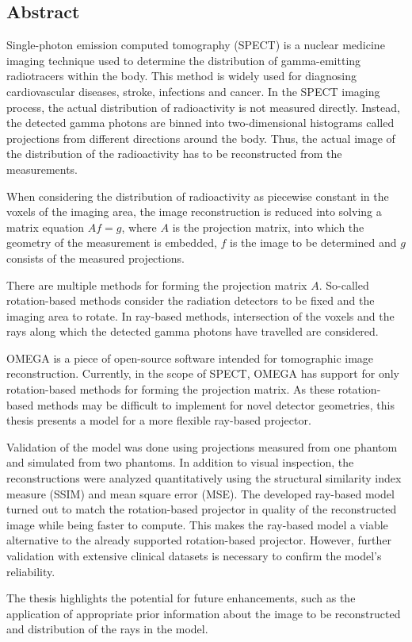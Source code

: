 \begin{titlepage}
    \section*{Abstract}
    Single-photon emission computed tomography (SPECT) is a nuclear medicine imaging technique used to determine the distribution of gamma-emitting radiotracers within the body. This method is widely used for diagnosing cardiovascular diseases, stroke, infections and cancer. In the SPECT imaging process, the actual distribution of radioactivity is not measured directly. Instead, the detected gamma photons are binned into two-dimensional histograms called projections from different directions around the body. Thus, the actual image of the distribution of the radioactivity has to be reconstructed from the measurements.
    
    When considering the distribution of radioactivity as piecewise constant in the voxels of the imaging area, the image reconstruction is reduced into solving a matrix equation $Af=g$, where $A$ is the projection matrix, into which the geometry of the measurement is embedded, $f$ is the image to be determined and $g$ consists of the measured projections.
    
    There are multiple methods for forming the projection matrix $A$. So-called rotation-based methods consider the radiation detectors to be fixed and the imaging area to rotate. In ray-based methods, intersection of the voxels and the rays along which the detected gamma photons have travelled are considered.
    
    OMEGA is a piece of open-source software intended for tomographic image reconstruction. Currently, in the scope of SPECT, OMEGA has support for only rotation-based methods for forming the projection matrix. As these rotation-based methods may be difficult to implement for novel detector geometries, this thesis presents a model for a more flexible ray-based projector.
    
    Validation of the model was done using projections measured from one phantom and simulated from two phantoms. In addition to visual inspection, the reconstructions were analyzed quantitatively using the structural similarity index measure (SSIM) and mean square error (MSE). The developed ray-based model turned out to match the rotation-based projector in quality of the reconstructed image while being faster to compute. This makes the ray-based model a viable alternative to the already supported rotation-based projector. However, further validation with extensive clinical datasets is necessary to confirm the model's reliability.
    
    The thesis highlights the potential for future enhancements, such as the application of appropriate prior information about the image to be reconstructed and distribution of the rays in the model.
\end{titlepage}